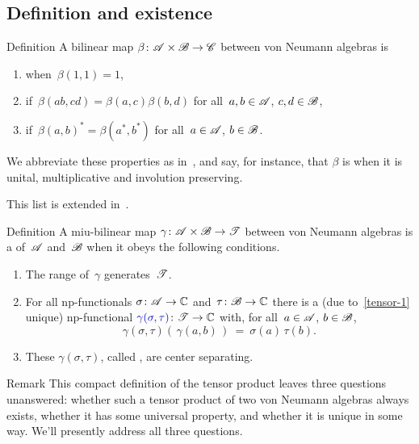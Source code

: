 \documentclass[a]{subfiles}
\begin{document}
\subsection{Definition and existence}
\begin{parsec}%
\begin{point}{Definition}%
A bilinear map $\beta\colon \mathscr{A}\times \mathscr{B}\to\mathscr{C}$
between von Neumann algebras is
\begin{enumerate}
\item
{}
when~$\beta(1,1)=1$,
\item
{}
if~$\beta(ab,cd)=\beta(a,c)\beta(b,d)$
for all~$a,b\in\mathscr{A}$, $c,d\in\mathscr{B}$,
\item
{}
if~$\beta(a,b)^*=\beta(a^*,b^*)$
for all~$a\in\mathscr{A}$, $b\in\mathscr{B}$.
\end{enumerate}
We abbreviate these properties as in~,
and say, for instance, that $\beta$ is 
when it is unital, multiplicative and involution preserving.

This list is extended in~.
\end{point}
\begin{point}[tensor]{Definition}%
A miu-bilinear map $\gamma\colon \mathscr{A}\times\mathscr{B}\to\mathscr{T}$
between von Neumann algebras
is a  
of~$\mathscr{A}$ and~$\mathscr{B}$
when it obeys the following conditions.
\begin{enumerate}
\item
\label{tensor-1}
The range of~$\gamma$ generates~$\mathscr{T}$.
\item
\label{tensor-2}
For all np-functionals
$\sigma\colon \mathscr{A}\to\mathbb{C}$ and~$\tau\colon \mathscr{B}\to\mathbb{C}$
there is a (due to~\ref{tensor-1} unique)
np-functional $\Define{\gamma(\sigma,\tau)}\colon \scrT\to\C$
with, for all~$a\in\mathscr{A}$, $b\in\mathscr{B}$,
\begin{equation*}
	\gamma(\sigma,\tau)(\,\gamma(a,b)\,)\ =\ \sigma(a)\,\tau(b).
\end{equation*}
\item
\label{tensor-3}
These $\gamma(\sigma,\tau)$,
called ,
are center separating.
\end{enumerate}
\end{point}
\begin{point}{Remark}%
This compact definition of the tensor product
leaves three questions unanswered:
whether such a tensor product of two von Neumann algebras
always exists,
whether it has some  universal property,
and whether it is unique in some way.
We'll presently address all three questions.
\end{point}
\end{parsec}
\end{document}
